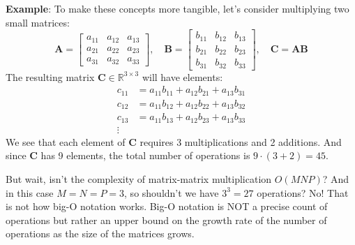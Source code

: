 \begin{exampleBox}
    \textbf{Example}: To make these concepts more tangible, let's consider multiplying two small matrices:
    \begin{equation*}
        \mathbf{A} = \begin{bmatrix}
        a_{11} & a_{12} & a_{13} \\
        a_{21} & a_{22} & a_{23} \\
        a_{31} & a_{32} & a_{33}
        \end{bmatrix}, \quad
        \mathbf{B} = \begin{bmatrix}
        b_{11} & b_{12} & b_{13} \\
        b_{21} & b_{22} & b_{23} \\
        b_{31} & b_{32} & b_{33}
        \end{bmatrix}, \quad
        \mathbf{C} = \mathbf{A}\mathbf{B}
    \end{equation*}
    The resulting matrix $ \mathbf{C} \in \mathbb{R}^{3\times 3} $ will have elements:
    \begin{align*}
        c_{11} & = a_{11}b_{11} + a_{12}b_{21} + a_{13}b_{31} \\
        c_{12} & = a_{11}b_{12} + a_{12}b_{22} + a_{13}b_{32} \\
        c_{13} & = a_{11}b_{13} + a_{12}b_{23} + a_{13}b_{33} \\
        \vdots &
    \end{align*}
    We see that each element of $ \mathbf{C} $ requires 3 multiplications and 2 additions. And since $ \mathbf{C} $ has 9 elements, the total number of operations is $ 9 \cdot (3 + 2) = 45 $. 
    
    But wait, isn't the complexity of matrix-matrix multiplication $ O(MNP) $? And in this case $M = N = P = 3$, so shouldn't we have $3^3 = 27$ operations? No! That is not how big-O notation works. Big-O notation is NOT a precise count of operations but rather an upper bound on the growth rate of the number of operations as the size of the matrices grows.
\end{exampleBox}

